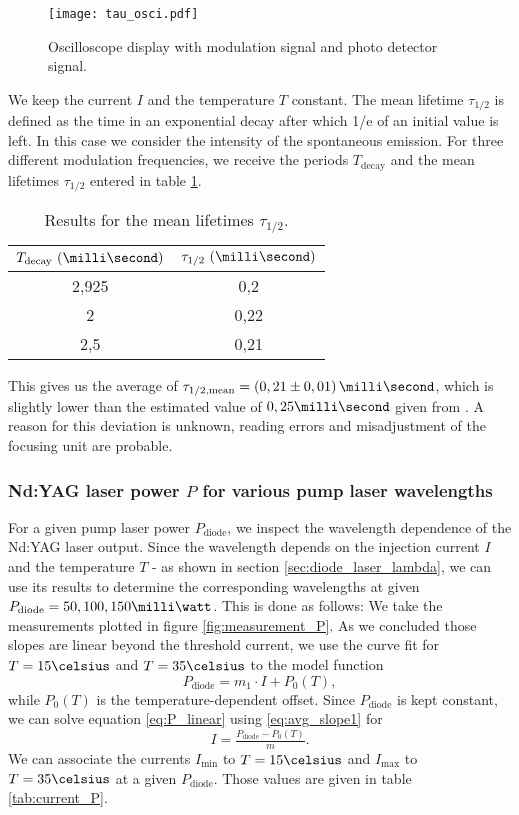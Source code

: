 \begin{figure}[h]
	\centering
	\texttt{[image: tau\_osci.pdf]}
	\caption[Mean lifetime: Oscilloscope]{Oscilloscope display with modulation signal and photo detector signal. \cite{lit:manual}}
	\label{fig:tau_osci}
\end{figure}

We keep the current $I$ and the temperature $T$ constant. The mean lifetime $\tau_{1/2}$ is defined as the time in an exponential decay after which 1/e of an initial value is left. In this case we consider the intensity of the spontaneous emission. For three different modulation frequencies, we receive the periods $T_\text{decay}$ and the mean lifetimes $\tau_{1/2}$ entered in table \ref{tab:tau}.

\begin{table}[h]
	\centering
	\caption{Results for the mean lifetimes $\tau_{1/2}$.}
	\begin{tabular}{c @{\qquad} c}
	\toprule
	$T_\text{decay}~(\milli\second)$ & $\tau_{1/2}~(\milli\second)$\\
	\midrule
	2,925	& 0,2\\
	2	& 0,22\\
	2,5 &	0,21\\
	\bottomrule
	\end{tabular}
	\label{tab:tau}
\end{table}

This gives us the average of $\tau_\text{1/2,mean}=(0,21\pm 0,01)\,\milli\second$, which is slightly lower than the estimated value of $0,25\milli\second$ given from \cite{lit:manual}. A reason for this deviation is unknown, reading errors and misadjustment of the focusing unit are probable.

\newpage
\subsubsection{Nd:YAG laser power $P$ for various pump laser wavelengths}
For a given pump laser power $P_\text{diode}$, we inspect the wavelength dependence of the Nd:YAG laser output. Since the wavelength depends on the injection current $I$ and the temperature $T$ - as shown in section \ref{sec:diode_laser_lambda}, we can use its results to determine the corresponding wavelengths at given $P_\text{diode}=50,100,150\milli\watt$.
This is done as follows:
We take the measurements plotted in figure \ref{fig:measurement_P}. As we concluded those slopes are linear beyond the threshold current, we use the curve fit for $T=15\celsius$ and $T=35\celsius$ to the model function
\begin{equation}
P_\text{diode}=m_1\cdot I+P_0(T),
\label{eq:P_linear}
\end{equation}
while $P_0(T)$ is the temperature-dependent offset. Since $P_\text{diode}$ is kept constant, we can solve equation \eqref{eq:P_linear} using \eqref{eq:avg_slope1} for 
\begin{equation}
I=\tfrac{P_\text{diode}-P_0(T)}{m}.
\end{equation}
We can associate the currents $I_\text{min}$ to $T=15\celsius$ and $I_\text{max}$ to $T=35\celsius$ at a given $P_\text{diode}$. Those values are given in table \ref{tab:current_P}.

